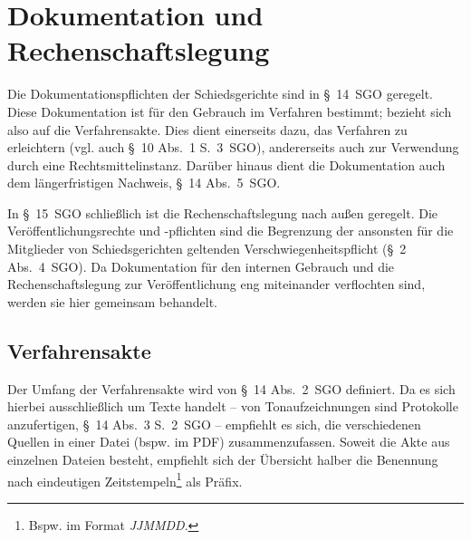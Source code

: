 
\chapter{Dokumentation und Rechenschaftslegung}
\label{Dokumentation}
Die Dokumentationspflichten der Schiedsgerichte sind in \S~14~SGO geregelt.
Diese Dokumentation ist für den Gebrauch im Verfahren bestimmt; bezieht sich also auf die Verfahrensakte.
Dies dient einerseits dazu, das Verfahren zu erleichtern (vgl. auch \S~10 Abs.~1 S.~3~SGO), andererseits auch zur Verwendung durch eine Rechtsmittelinstanz.
Darüber hinaus dient die Dokumentation auch dem längerfristigen Nachweis, \S~14 Abs.~5~SGO.

In \S~15~SGO schließlich ist die Rechenschaftslegung nach außen geregelt.
Die Veröffentlichungsrechte und -pflichten sind die Begrenzung der ansonsten für die Mitglieder von Schiedsgerichten geltenden Verschwiegenheitspflicht (\S~2 Abs.~4~SGO).
Da Dokumentation für den internen Gebrauch und die Rechenschaftslegung zur Veröffentlichung eng miteinander verflochten sind, werden sie hier gemeinsam behandelt.

\section{Verfahrensakte}
\label{Dokumentation:Akte}
Der Umfang der Verfahrensakte wird von \S~14 Abs.~2~SGO definiert.
Da es sich hierbei ausschließlich um Texte handelt -- von Tonaufzeichnungen sind Protokolle anzufertigen, \S~14 Abs.~3 S.~2~SGO -- empfiehlt es sich, die verschiedenen Quellen in einer Datei (bspw. im PDF) zusammenzufassen.
Soweit die Akte aus einzelnen Dateien besteht, empfiehlt sich der Übersicht halber die Benennung nach eindeutigen Zeitstempeln\footnote{Bspw. im Format \emph{JJMMDD}.} als Präfix.

